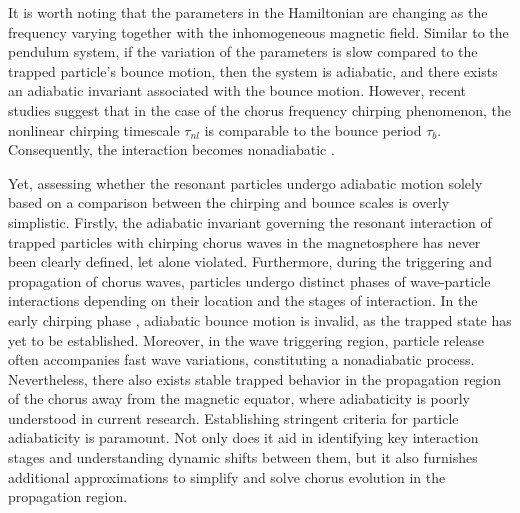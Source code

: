It is worth noting that the parameters in the Hamiltonian are changing as the frequency varying together with the inhomogeneous magnetic field.
Similar to the pendulum system, if the variation of the parameters is slow compared to the trapped particle's bounce motion, then the system is adiabatic, and there exists an adiabatic invariant associated with the bounce motion.
However, recent studies suggest that in the case of the chorus frequency chirping phenomenon, the nonlinear chirping timescale $\tau_{nl}$ is comparable to the bounce period $\tau_{b}$. 
Consequently, the interaction becomes nonadiabatic \cite{tao2017a,tao2017b}.

Yet, assessing whether the resonant particles undergo adiabatic motion solely based on a comparison between the chirping and bounce scales is overly simplistic.
Firstly, the adiabatic invariant governing the resonant interaction of trapped particles with chirping chorus waves in the magnetosphere has never been clearly defined, let alone violated.
Furthermore, during the triggering and propagation of chorus waves, particles undergo distinct phases of wave-particle interactions depending on their location and the stages of interaction.
In the early chirping phase \cite{bierwage2021}, adiabatic bounce motion is invalid, as the trapped state has yet to be established.
Moreover, in the wave triggering region, particle release \cite{tao_trap-release-amplify_2021} often accompanies fast wave variations, constituting a nonadiabatic process.
Nevertheless, there also exists stable trapped behavior \cite{zheng2024} in the propagation region of the chorus away from the magnetic equator, where adiabaticity is poorly understood in current research. 
Establishing stringent criteria for particle adiabaticity is paramount.
Not only does it aid in identifying key interaction stages and understanding dynamic shifts between them, but it also furnishes additional approximations to simplify and solve chorus evolution in the propagation region.

